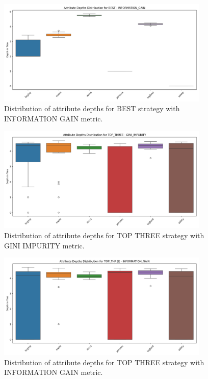 \documentclass[12pt]{article}
\begin{document}
\begin{figure}[H]
    \centering
    \includegraphics[width=0.9\textwidth]{plots/attribute_depths_BEST_INFORMATION_GAIN.png}
    \caption{Distribution of attribute depths for BEST strategy with INFORMATION GAIN metric.}
    \label{fig:attr-best-ig}
\end{figure}
\newpage

\begin{figure}[H]
    \centering
    \includegraphics[width=0.9\textwidth]{plots/attribute_depths_TOP_THREE_GINI_IMPURITY.png}
    \caption{Distribution of attribute depths for TOP THREE strategy with GINI IMPURITY metric.}
    \label{fig:attr-top3-gini}
\end{figure}
\newpage

\begin{figure}[H]
    \centering
    \includegraphics[width=0.9\textwidth]{plots/attribute_depths_TOP_THREE_INFORMATION_GAIN.png}
    \caption{Distribution of attribute depths for TOP THREE strategy with INFORMATION GAIN metric.}
    \label{fig:attr-top3-ig}
\end{figure}
\newpage
\end{document}
